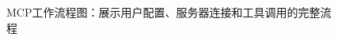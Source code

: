 \begin{figure}
  \centering
  \caption{MCP工作流程图：展示用户配置、服务器连接和工具调用的完整流程}
  \label{fig:mcp_workflow}
\end{figure}


